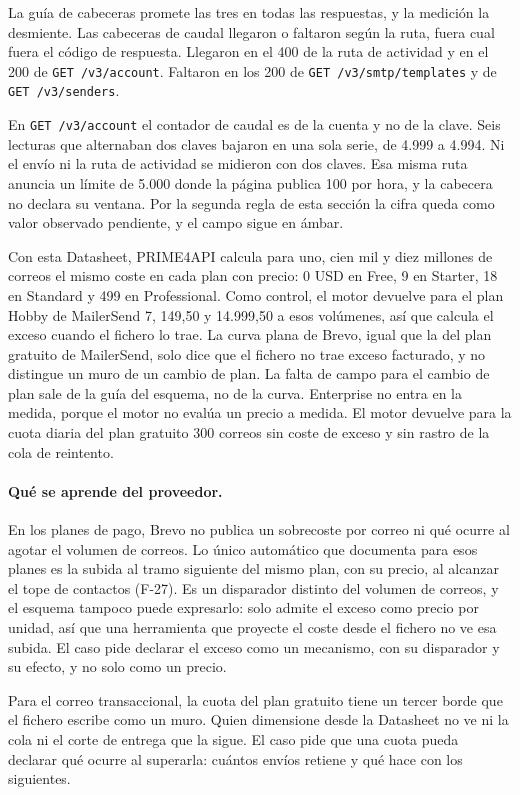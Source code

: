 La guía de cabeceras promete las tres en todas las respuestas, y la medición la desmiente. Las cabeceras de caudal llegaron o faltaron según la
ruta, fuera cual fuera el código de respuesta. Llegaron en el 400 de la
ruta de actividad y en el 200 de \texttt{GET /v3/account}. Faltaron en
los 200 de \texttt{GET /v3/smtp/templates} y de \texttt{GET /v3/senders}.

En \texttt{GET /v3/account} el contador de caudal es de la cuenta y no de
la clave. Seis lecturas que alternaban dos claves bajaron en una sola
serie, de 4.999 a 4.994. Ni el envío ni la ruta de actividad se midieron
con dos claves. Esa misma ruta anuncia un límite de 5.000 donde la página
publica 100 por hora, y la cabecera no declara su ventana. Por la segunda regla de esta sección la cifra queda como valor
observado pendiente, y el campo sigue en ámbar.

Con esta Datasheet, PRIME4API calcula para uno, cien mil y diez millones
de correos el mismo coste en cada plan con precio: 0 USD en Free, 9 en
Starter, 18 en Standard y 499 en Professional. Como control, el motor
devuelve para el plan Hobby de MailerSend 7, 149,50 y 14.999,50 a esos
volúmenes, así que calcula el exceso cuando el fichero lo trae. La curva plana de Brevo, igual que la del plan gratuito de
MailerSend, solo dice que el fichero no trae exceso facturado, y no
distingue un muro de un cambio de plan. La falta de campo para el cambio
de plan sale de la guía del esquema, no de la curva. Enterprise no entra
en la medida, porque el motor no evalúa un precio a medida. El motor
devuelve para la cuota diaria del plan gratuito 300 correos sin coste de
exceso y sin rastro de la cola de reintento.

\paragraph{Qué se aprende del proveedor.} En los planes de pago, Brevo no
publica un sobrecoste por correo ni qué ocurre al agotar el volumen de
correos. Lo único automático que documenta para esos planes es la subida al tramo siguiente del mismo plan, con su precio, al alcanzar el tope de
contactos (F-27). Es un disparador distinto del volumen de correos, y el
esquema tampoco puede expresarlo: solo admite el exceso como precio por
unidad, así que una herramienta que proyecte el coste desde el fichero no ve
esa subida. El caso pide declarar el exceso
como un mecanismo, con su disparador y su efecto, y no solo como un precio.

Para el correo transaccional, la cuota del plan gratuito tiene un tercer borde que el fichero escribe como un muro. Quien dimensione desde la Datasheet no ve ni la cola ni el corte de entrega que la sigue. El caso pide que una cuota pueda declarar
qué ocurre al superarla: cuántos envíos retiene y qué hace con los
siguientes.

